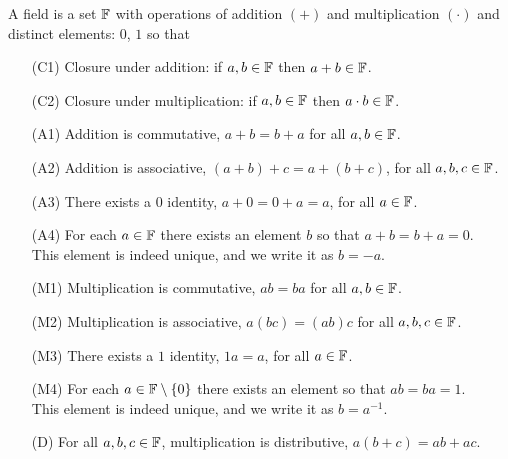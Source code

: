 \begin{defn}
A field is a set $\mathbb{F}$ with operations of addition $(+)$ and multiplication $(\cdot)$ and distinct elements: $0$, $1$ so that
\begin{enumerate}
    \item[(C1)] Closure under addition: if $a,b\in\mathbb{F}$ then $a+b\in\mathbb{F}$.
    \item[(C2)] Closure under multiplication: if $a,b\in\mathbb{F}$ then $a\cdot b\in \mathbb{F}$.
    \item[(A1)] Addition is commutative, $a+b=b+a$ for all $a,b\in\mathbb{F}$.
    \item[(A2)] Addition is associative, $(a+b)+c=a+(b+c)$, for all $a,b,c\in\mathbb{F}$.
    \item[(A3)] There exists a $0$ identity, $a+0=0+a=a$, for all $a\in\mathbb{F}$.
    \item[(A4)] For each $a\in\mathbb{F}$ there exists an element $b$ so that $a+b=b+a=0$.\\
    This element is indeed unique, and we write it as $b=-a$.
    \item[(M1)] Multiplication is commutative, $ab=ba$ for all $a,b\in\mathbb{F}$.
    \item[(M2)] Multiplication is associative, $a(bc)=(ab)c$ for all $a,b,c\in\mathbb{F}$.
    \item[(M3)] There exists a $1$ identity, $1a=a$, for all $a\in\mathbb{F}$.
    \item[(M4)] For each $a\in\mathbb{F}\setminus \{0\}$ there exists an element so that $ab=ba=1$.\\
    This element is indeed unique, and we write it as $b=a^{-1}$.
    \item[(D)] For all $a,b,c\in\mathbb{F}$, multiplication is distributive, $a(b+c)=ab+ac$.
 \end{enumerate}
\end{defn}
